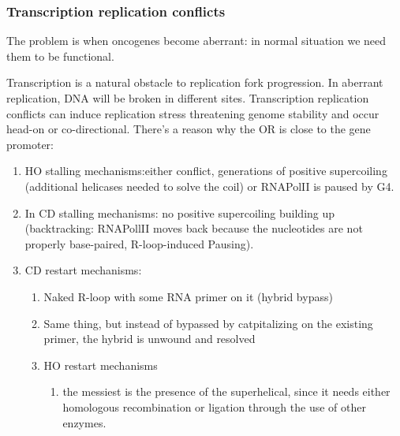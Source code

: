 \hypertarget{transcription-replication-conflicts}{%
\subsubsection{Transcription replication
conflicts}\label{transcription-replication-conflicts}}

The problem is when oncogenes become aberrant: in normal situation we
need them to be functional.

Transcription is a natural obstacle to replication fork progression. In
aberrant replication, DNA will be broken in different sites. 
Transcription replication conflicts can induce replication stress
threatening genome stability and
occur head-on or co-directional. There's a reason why the OR is close to
the gene promoter:

\begin{enumerate}
\def\labelenumi{\arabic{enumi}.}
\tightlist
\item
  HO stalling mechanisms:either conflict, generations of
  positive supercoiling (additional helicases needed to solve the coil)
  or RNAPolII is paused by G4.
\item
  In CD stalling mechanisms: no positive supercoiling building up
  (backtracking: RNAPollII moves back because the nucleotides are not
  properly base-paired, R-loop-induced Pausing).
\item
  CD restart mechanisms:

  \begin{enumerate}
  \def\labelenumii{\arabic{enumii}.}
  \tightlist
  \item
    Naked R-loop with some RNA primer on it (hybrid bypass)
  \item
    Same thing, but instead of bypassed by catpitalizing on the existing
    primer, the hybrid is unwound and resolved
  \item
    HO restart mechanisms

    \begin{enumerate}
    \def\labelenumiii{\arabic{enumiii}.}
    \tightlist
    \item
      the messiest is the presence of the superhelical, since it needs
      either homologous recombination or ligation through the use of other
      enzymes.
    \end{enumerate}
  \end{enumerate}
\end{enumerate}

